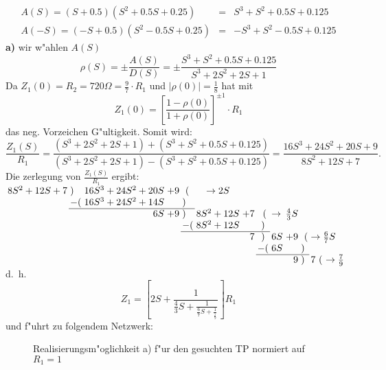 \begin{eqnarray*}
A(S)=(S+0.5)(S^2 + 0.5 S + 0.25)&=&   S^3  + S^2  + 0.5 S + 0.125 \\
A(-S)=(-S+0.5)(S^2-0.5 S + 0.25)&=&-S^3 + S^2 -0.5 S + 0.125
\end{eqnarray*}
{\bf a)} wir w"ahlen $A(S)$
\[
\rho(S)=\pm \frac{A(S)}{D(S)}=\pm \frac{S^3 + S^2 + 0.5 S + 0.125}
                                           {S^3 + 2 S^2 + 2 S + 1} 
\]
\nit Da $Z_1(0)=R_2=720 \Omega=\frac{9}{7} \cdot R_1$ und 
$| \rho(0) |=\frac{1}{8}$ hat mit
\[
Z_1(0)=\left[ \frac{1-\rho(0)}{1 + \rho(0)} \right]^{\pm 1} \cdot R_1 
\]
\nit das neg. Vorzeichen G"ultigkeit. Somit wird:
\begin{equation*}
\frac{Z_1(S)}{R_1}=\frac{(S^3 + 2 S^2 + 2 S + 1) + (S^3 + S^2 + 0.5 S + 0.125)}
  {(S^3 + 2 S^2 + 2 S + 1)-(S^3 + S^2 + 0.5 S + 0.125)}=\frac{16 S^3 + 24 S^2 + 20 S + 9}{8 S^2 + 12 S + 7}.
\end{equation*}
\nit Die zerlegung von $\frac{Z_1(S)}{R_1}$ ergibt:\\
$
\setlength{\arraycolsep}{0.3\arraycolsep}
\begin{array}{rlrclcrclrll}
8S^2+12S+7&)&16S^3+24S^2+20S&+9&~(& \rightarrow 2S &&&&&&\\
   &-(&16S^3+24S^2+14S&  &) &&&&&&&\\ \cline{2-5}
      && 6S&+9&) &8S^2+12S&+7&~(& \rightarrow &\frac{4}{3} S&&\\
         &&&&-(&8S^2+12S&  &) &&&&\\ \cline{5-8}
            &&&&&&  7&) &6S&+9&~(&\rightarrow \frac{6}{7} S\\
               &&&&&&&-(&6S&  &) & \\ \cline{8-11}
                  &&&&&&&&& 9&) &7 ~( ~\rightarrow \frac{7}{9}
\end{array}$\\
\nit d.~h.\[
Z_{1}=
[ 2S+\frac{1}{
\displaystyle\frac{4}{3}S+
\displaystyle\frac{1}{
\displaystyle\frac{6}{7}S+
\displaystyle\frac{1}{
\displaystyle\frac{7}{9}}}}] R_{1}
\]
und f"uhrt zu folgendem Netzwerk:\\
\begin{figure}[!htb]\vspace*{-7mm}
\begin{center}
  \vspace*{-4mm}\caption{Realisierungsm"oglichkeit a) f"ur den gesuchten TP normiert auf 
  $R_1=1$}
\end{center}
\vspace*{-7mm}
\end{figure}\\

